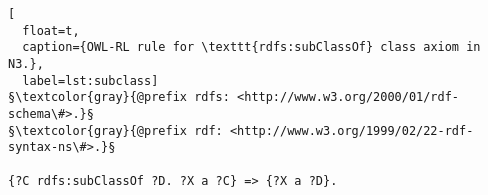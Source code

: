 %
% 
% 
% 
\begin{lstlisting}[
  float=t,
  caption={OWL-RL rule for \texttt{rdfs:subClassOf} class axiom in N3.},
  label=lst:subclass]
§\textcolor{gray}{@prefix rdfs: <http://www.w3.org/2000/01/rdf-schema\#>.}§
§\textcolor{gray}{@prefix rdf: <http://www.w3.org/1999/02/22-rdf-syntax-ns\#>.}§

{?C rdfs:subClassOf ?D. ?X a ?C} => {?X a ?D}.
\end{lstlisting}
